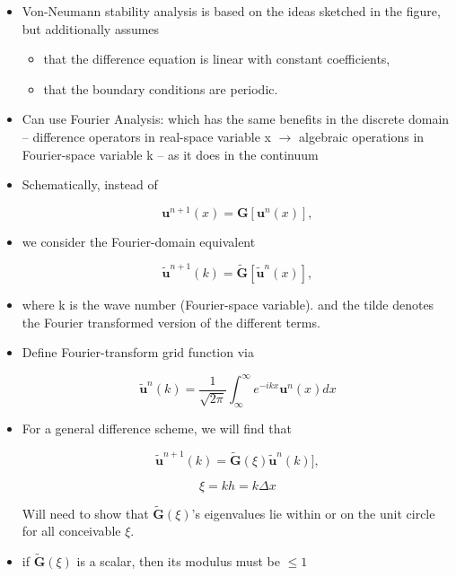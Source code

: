 \begin{itemize}

    \item Von-Neumann stability analysis is based on the ideas sketched in the figure, but additionally assumes
    \begin{itemize}
        \item that the difference equation is linear with constant coefficients,
        \item that the boundary conditions are periodic.
    \end{itemize}

    \item Can use Fourier Analysis: which has the same benefits in the discrete domain -- difference operators in real-space variable x $\rightarrow$ algebraic operations in Fourier-space variable k -- as it does in the continuum 
    
    \item Schematically, instead of 

    \[ \mathbf{u}^{n+1}(x) = \mathbf{G}[\mathbf{u}^n(x)],\]

    \item we consider the Fourier-domain equivalent

    \[ \tilde{\mathbf{u}}^{n+1}(k) = \tilde{\mathbf{G}}[\tilde{\mathbf{u}}^n(x)],\]

    \item where k is the wave number (Fourier-space variable). and the tilde denotes the Fourier transformed version of the different terms.

    \item Define Fourier-transform grid function via

    \begin{equation}
    \tilde{\mathbf{u}}^{n}(k) = \frac{1}{\sqrt{2 \pi}} \int_{\infty}^{\infty} e^{-ikx} \mathbf{u}^n(x) dx
    \end{equation}

    \item For a general difference scheme, we will find that

    \[ \tilde{\mathbf{u}}^{n+1}(k) = \tilde{\mathbf{G}}(\xi)\tilde{\mathbf{u}}^n(k)],\]

    \[ \xi = kh = k \Delta x\]

    Will need to show that $\tilde{\mathbf{G}}(\xi)$'s eigenvalues lie within or on the unit circle for all conceivable $\xi$.

    \item if $\tilde{\mathbf{G}}(\xi)$ is a scalar, then its modulus must be $\le 1$


\end{itemize}
